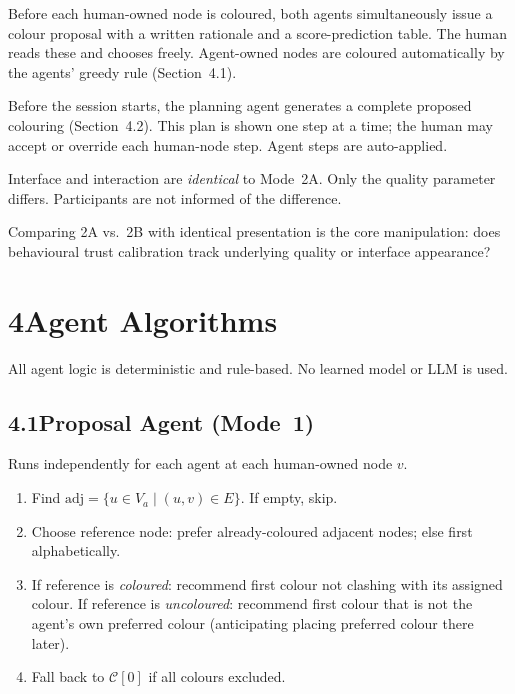 \documentclass[9pt,twocolumn]{article}
\begin{document}
\begin{description}[leftmargin=1em, itemsep=2pt]
  \item[Mode~1 — Manual Collaborative.]
    Before each human-owned node is coloured, both agents simultaneously issue a
    colour proposal with a written rationale and a score-prediction table.  The human
    reads these and chooses freely.  Agent-owned nodes are coloured automatically by
    the agents' greedy rule (Section~4.1).

  \item[Mode~2A — Autonomous, High Quality ($q=0.8$).]
    Before the session starts, the planning agent generates a complete proposed
    colouring (Section~4.2).  This plan is shown one step at a time; the human may
    accept or override each human-node step.  Agent steps are auto-applied.

  \item[Mode~2B — Autonomous, Low Quality ($q=0.3$).]
    Interface and interaction are \emph{identical} to Mode~2A.  Only the quality
    parameter differs.  Participants are not informed of the difference.
\end{description}

Comparing 2A vs.\ 2B with identical presentation is the core manipulation: does
behavioural trust calibration track underlying quality or interface appearance?

\section*{4\quad Agent Algorithms}

All agent logic is deterministic and rule-based.  No learned model or LLM is used.

\subsection*{4.1\quad Proposal Agent (Mode~1)}

Runs independently for each agent at each human-owned node $v$.

\begin{enumerate}
  \item Find $\mathrm{adj} = \{u \in V_a \mid (u,v)\in E\}$.  If empty, skip.
  \item Choose reference node: prefer already-coloured adjacent nodes; else first
    alphabetically.
  \item If reference is \emph{coloured}: recommend first colour not clashing with its
    assigned colour.  If reference is \emph{uncoloured}: recommend first colour that
    is not the agent's own preferred colour (anticipating placing preferred colour
    there later).
  \item Fall back to $\mathcal{C}[0]$ if all colours excluded.
\end{enumerate}
\end{document}
